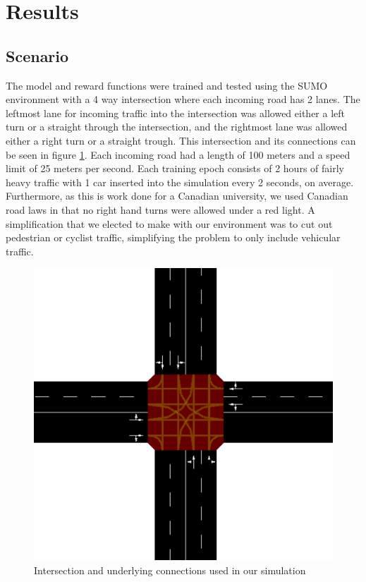 \documentclass[12pt,twocolumn]{article}
\begin{document}
\section{Results}

\subsection{Scenario}
The model and reward functions were trained and tested using the SUMO environment \cite{SUMO2018} with a 4 way intersection where each incoming road has 2 lanes. The leftmost lane for incoming traffic into the intersection was allowed either a left turn or a straight through the intersection, and the rightmost lane was allowed either a right turn or a straight trough. This intersection and its connections can be seen in figure \ref{fig:intersection_example}. Each incoming road had a length of 100 meters and a speed limit of 25 meters per second. Each training epoch consists of 2 hours of fairly heavy traffic with 1 car inserted into the simulation every 2 seconds, on average. Furthermore, as this is work done for a Canadian university, we used Canadian road laws in that no right hand turns were allowed under a red light. A simplification that we elected to make with our environment was to cut out pedestrian or cyclist traffic, simplifying the problem to only include vehicular traffic.

\begin{figure}
    \begin{center}
        \includegraphics[height=0.25\textheight]{Figures/intersection_example}
        \caption{Intersection and underlying connections used in our simulation}
        \label{fig:intersection_example}
    \end{center}
\end{figure}
\end{document}
